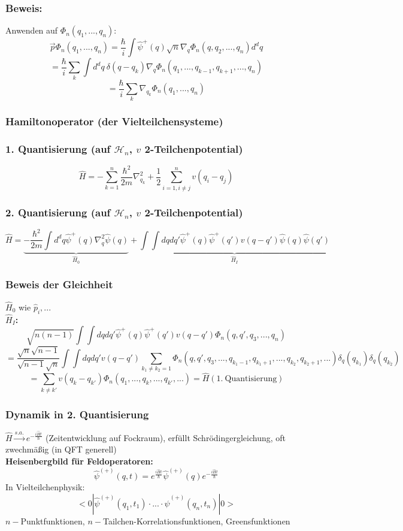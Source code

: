 \documentclass[twoside,a4paper]{scrartcl}
\renewcommand{\1}{\mathds{1}}
\newcommand{\ra}{\rightarrow}
\renewcommand{\H}{\mathcal{H}}
\begin{document}
\subsubsection*{Beweis:}
Anwenden auf $\Phi_n(q_1,...,q_n)$:\\
$$\vec p \Phi_n(q_1,...,q_n)=\frac{\hbar}{i} \int \hat \psi^+(q) \sqrt{n} \nabla_q \Phi_n(q,q_2,...,q_n) d^dq$$
$$=\frac{\hbar}{i} \sum_k \int d^dq \ \delta(q-q_k) \nabla_q \Phi_n(q_1,...,q_{k-1},q_{k+1},...,q_n) $$
$$=\frac{\hbar}{i} \sum_k  \nabla_{q_k} \Phi_n(q_1,...,q_n) $$
\subsubsection*{Hamiltonoperator (der Vielteilchensysteme)}
\subsubsection*{1. Quantisierung (auf $\H_n$, $v$ 2-Teilchenpotential)}
$$\hat H=-\sum_{k=1}^n \frac{\hbar^2}{2m} \nabla^2_{q_k}+\frac{1}{2}\sum_{i=1,i\neq j}^n v(q_i-q_j)$$
\subsubsection*{2. Quantisierung (auf $\H_n$, $v$ 2-Teilchenpotential)}
$$\hat H=\underbrace{-\frac{\hbar^2}{2m}\int d^dq \hat \psi^+(q)  \nabla_{q}^2 \hat \psi(q)}_{\hat H_0}+\underbrace{\int \int dq dq' \hat \psi^+(q) \hat \psi^+(q') v(q-q')\hat \psi(q) \hat \psi(q') }_{\hat H_I}$$
\subsubsection*{Beweis der Gleichheit}
$\hat H_0$ wie $\hat p_i,...$\\
\textbf{$\hat H_I$:}\\
$$\sqrt{n(n-1)} \int \int dq dq' \hat \psi^+(q) \hat \psi^+(q') v(q-q') \Phi_n(q,q',q_3,...,q_n)$$
$$=\frac{\sqrt{n}\sqrt{n-1}}{\sqrt{n-1}\sqrt{n}}\int \int dq dq'  v(q-q') \sum_{k_1\neq k_2=1} \Phi_n(q,q',q_3,...,q_{k_1-1},q_{k_1+1},...,q_{k_2},q_{k_2+1},...) \delta_q(q_{k_1})\delta_q(q_{k_2})$$
$$=\sum_{k\neq k'} v(q_k-q_{k'})\Phi_n(q_1,...,q_k,...,q_{k'},...)=\hat H(1. \ \mathrm{Quantisierung})$$

\subsubsection*{Dynamik in 2. Quantisierung}
$\hat H \stackrel{s.a.}{\ra} e^{-\frac{i\hat H t}{\hbar}}$ (Zeitentwicklung auf Fockraum), erfüllt Schrödingergleichung, oft zwechmäßig (in QFT generell)\\
\textbf{Heisenbergbild für Feldoperatoren:}\\
$$\hat \psi^{(+)}(q,t)=e^{\frac{i\hat H t}{\hbar}} \hat \psi^{(+)}(q)e^{-\frac{i\hat H t}{\hbar}}$$
In Vielteilchenphysik:
$$<0|\hat\psi^{(+)}(q_1,t_1)\cdot ... \cdot\hat\psi^{(+)}(q_n,t_n)|0> $$
$n-$Punktfunktionen, $n-$Tailchen-Korrelationsfunktionen, Greensfunktionen\\
\end{document}
